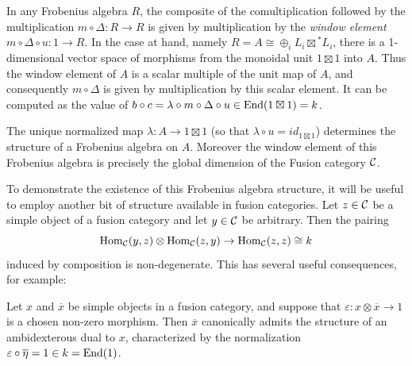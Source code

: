 \documentclass{amsart}
\begin{document}
In any Frobenius algebra $R$, the composite of the comultiplication followed by the multiplication $m \circ \Delta: R \to R$ is given by multiplication by the {\em window element} $m \circ \Delta \circ u: 1 \to R$. In the case at hand, namely $R = A \cong \oplus_i L_i \boxtimes {}^*L_i$, there is a 1-dimensional vector space of morphisms from the monoidal unit $1 \boxtimes 1$ into $A$. Thus the window element of $A$ is a scalar multiple of the unit map of $A$, and consequently $m \circ \Delta$ is given by multiplication by this scalar element. It can be computed as the value of $ b \circ c =  \lambda \circ m \circ \Delta \circ u \in \operatorname{End}(1 \boxtimes 1) = k$. 

\begin{proposition} \label{prop:FrobAlg_for_fusion}
	The unique normalized map $\lambda:A \to 1 \boxtimes 1$ (so that $\lambda \circ u = id_{1 \boxtimes 1}$) determines the structure of a Frobenius algebra on $A$. Moreover the window element of this Frobenius algebra is precisely the global dimension of the Fusion category $\mathcal C$. 
\end{proposition}

To demonstrate the existence of this Frobenius algebra structure, it will be useful to employ another bit of structure available in fusion categories. 
Let $z \in \mathcal C$ be a simple object of a fusion category and let $y \in \mathcal C$ be arbitrary. Then the pairing
\begin{equation*}
	\operatorname{Hom}_{\mathcal C}(y,z) \otimes \operatorname{Hom}_{\mathcal C}(z,y) \to \operatorname{Hom}_{\mathcal C}(z,z) \cong k
\end{equation*}
induced by composition is non-degenerate. This has several useful consequences, for example:

\begin{lemma} \label{lma:canonical_ambidextrous}
	Let $x$ and $\overline{x}$ be simple objects in a fusion category, and suppose that $\varepsilon: x \otimes \overline{x} \to 1$ is a chosen non-zero morphism. Then $\overline{x}$ canonically admits the structure of an ambidexterous dual to $x$, characterized by the normalization $\varepsilon \circ \overline{\eta} = 1 \in k = \operatorname{End}(1)$. 
\end{lemma}
\end{document}
